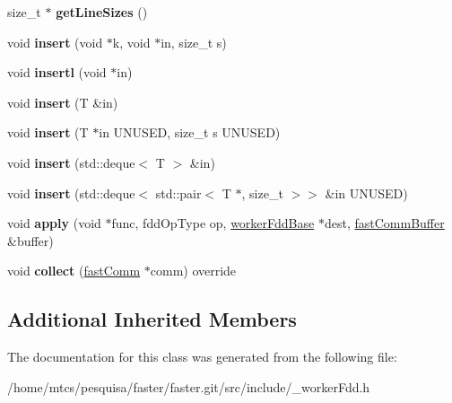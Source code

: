 \begin{DoxyCompactItemize}
\item 
\hypertarget{classfaster_1_1__workerFdd_a077e924de9bd3bf06f6dd9b315172679}{}size\+\_\+t $\ast$ {\bfseries get\+Line\+Sizes} ()\label{classfaster_1_1__workerFdd_a077e924de9bd3bf06f6dd9b315172679}

\item 
\hypertarget{classfaster_1_1__workerFdd_a34cd7025c01c615d8da5b2994c3cd4fb}{}void {\bfseries insert} (void $\ast$k, void $\ast$in, size\+\_\+t s)\label{classfaster_1_1__workerFdd_a34cd7025c01c615d8da5b2994c3cd4fb}

\item 
\hypertarget{classfaster_1_1__workerFdd_a7c870a264f47310d61d4dc388d7fb588}{}void {\bfseries insertl} (void $\ast$in)\label{classfaster_1_1__workerFdd_a7c870a264f47310d61d4dc388d7fb588}

\item 
\hypertarget{classfaster_1_1__workerFdd_a16d0b3a72dee9067c78e6de5c00344d5}{}void {\bfseries insert} (T \&in)\label{classfaster_1_1__workerFdd_a16d0b3a72dee9067c78e6de5c00344d5}

\item 
\hypertarget{classfaster_1_1__workerFdd_aa4e0cbecfd3b70916364afb85ebbb042}{}void {\bfseries insert} (T $\ast$in U\+N\+U\+S\+E\+D, size\+\_\+t s U\+N\+U\+S\+E\+D)\label{classfaster_1_1__workerFdd_aa4e0cbecfd3b70916364afb85ebbb042}

\item 
\hypertarget{classfaster_1_1__workerFdd_af8d23cf110e95bd4a57ed8911e462fcd}{}void {\bfseries insert} (std\+::deque$<$ T $>$ \&in)\label{classfaster_1_1__workerFdd_af8d23cf110e95bd4a57ed8911e462fcd}

\item 
\hypertarget{classfaster_1_1__workerFdd_a5294bdf9244698046005cd985fc32047}{}void {\bfseries insert} (std\+::deque$<$ std\+::pair$<$ T $\ast$, size\+\_\+t $>$$>$ \&in U\+N\+U\+S\+E\+D)\label{classfaster_1_1__workerFdd_a5294bdf9244698046005cd985fc32047}

\item 
\hypertarget{classfaster_1_1__workerFdd_a77120c8d7ec05e6683acc699dfa86743}{}void {\bfseries apply} (void $\ast$func, fdd\+Op\+Type op, \hyperlink{classfaster_1_1workerFddBase}{worker\+Fdd\+Base} $\ast$dest, \hyperlink{classfaster_1_1fastCommBuffer}{fast\+Comm\+Buffer} \&buffer)\label{classfaster_1_1__workerFdd_a77120c8d7ec05e6683acc699dfa86743}

\item 
\hypertarget{classfaster_1_1__workerFdd_a5571e749cf6d7c1ce83e1a2d242d0240}{}void {\bfseries collect} (\hyperlink{classfaster_1_1fastComm}{fast\+Comm} $\ast$comm) override\label{classfaster_1_1__workerFdd_a5571e749cf6d7c1ce83e1a2d242d0240}

\end{DoxyCompactItemize}
\subsection*{Additional Inherited Members}


The documentation for this class was generated from the following file\+:\begin{DoxyCompactItemize}
\item 
/home/mtcs/pesquisa/faster/faster.\+git/src/include/\+\_\+worker\+Fdd.\+h\end{DoxyCompactItemize}
